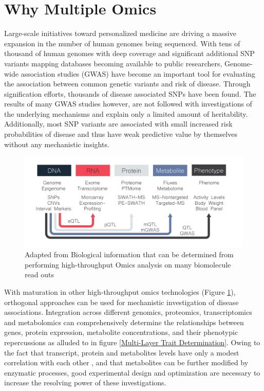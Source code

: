 \documentclass[a4paper,11pt,twoside]{book}
\begin{document}
	\section{Why Multiple Omics}
	
	Large-scale initiatives toward personalized medicine are driving a massive expansion in the number of human genomes being sequenced. With tens of thousand of human genomes with deep coverage \citep{Telenti2016Deepgenomes} and significant additional SNP variants mapping databases becoming available to public researchers, Genome-wide association studies (GWAS) have become an important tool for evaluating the association between common genetic variants and risk of disease. Through signification efforts, thousands of disease associated SNPs have been found\citep{Johnson2009AnResults.}. The results of many GWAS studies however, are not followed with investigations of the underlying mechanisms and explain only a limited amount of heritability. Additionally, most SNP variants are associated with small increased risk probabilities of disease and thus have weak predictive value by themselves without any mechanistic insights. 
	
	\begin{figure}
		\includegraphics[width=1.2\textwidth]{1.Introduction_Figures/Multiomics.pdf}
		\caption{Adapted from \citep{Dumas2012} Biological information that can be determined from performing high-throughput Omics analysis on many biomolecule read outs}
		\label{fig:Multi_Omics Methods}
	\end{figure}
	
	With maturation in other high-throughput omics technologies (Figure \ref{fig:Multi_Omics Methods}), orthogonal approaches can be used for mechanistic investigation of disease associations. Integration across different genomics, proteomics, transcriptomics and metabolomics can comprehensively determine the relationships between genes, protein expression, metabolite concentrations, and their phenotypic repercussions as alluded to in figure \ref{Multi-Layer Trait Determination}. Owing to the fact that transcript, protein and metabolites levels have only a modest correlation with each other \citep{Williams2016SystemsFunction}, and that metabolites can be further modified by enzymatic processes, good experimental design and optimization are necessary to increase the resolving power of these investigations. 
	
\end{document}
